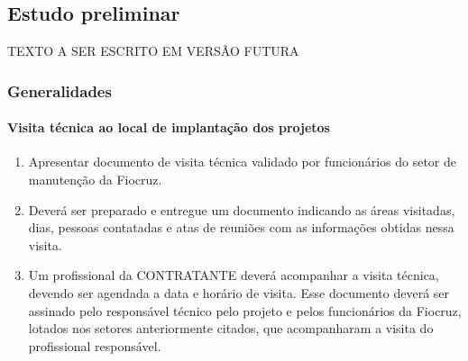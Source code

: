 \subsection{Estudo preliminar} \label{subsection: estudo preliminar}

TEXTO A SER ESCRITO EM VERSÃO FUTURA

\subsubsection{Generalidades}

\paragraph{Visita técnica ao local de implantação dos projetos}

	\begin{enumerate}
	
		\item Apresentar documento de visita técnica validado por funcionários do setor de manutenção da Fiocruz.
		\item Deverá ser preparado e entregue um documento indicando as áreas visitadas, dias, pessoas contatadas e atas de reuniões com as informações obtidas nessa visita.
		\item Um profissional da CONTRATANTE deverá acompanhar a visita técnica, devendo ser agendada a data e horário de visita. Esse documento deverá ser assinado pelo responsável técnico pelo projeto e pelos funcionários da Fiocruz, lotados nos setores anteriormente citados, que acompanharam a visita do profissional responsável.
	\end{enumerate}

